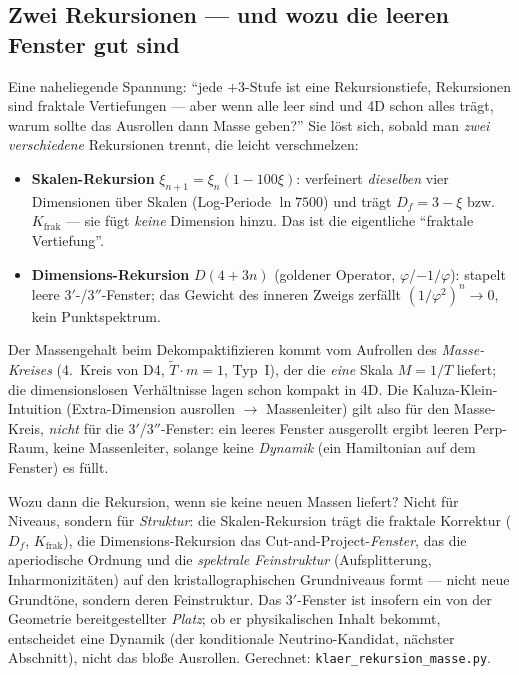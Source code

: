 \subsection{Zwei Rekursionen --- und wozu die leeren Fenster gut sind}
Eine naheliegende Spannung: \enquote{jede $+3$-Stufe ist eine Rekursionstiefe, Rekursionen sind
fraktale Vertiefungen --- aber wenn alle leer sind und 4D schon alles tr\"agt, warum sollte das
Ausrollen dann Masse geben?} Sie l\"ost sich, sobald man \emph{zwei verschiedene} Rekursionen
trennt, die leicht verschmelzen:
\begin{itemize}
  \item \textbf{Skalen-Rekursion} $\xi_{n+1}=\xi_n(1-100\xi)$: verfeinert \emph{dieselben} vier
  Dimensionen \"uber Skalen (Log-Periode $\ln 7500$) und tr\"agt $D_f=3-\xi$ bzw.\ $K_{\text{frak}}$
  --- sie f\"ugt \emph{keine} Dimension hinzu. Das ist die eigentliche \enquote{fraktale Vertiefung}.
  \item \textbf{Dimensions-Rekursion} $D(4+3n)$ (goldener Operator, $\varphi$/$-1/\varphi$): stapelt
  leere $3'$-/$3''$-Fenster; das Gewicht des inneren Zweigs zerf\"allt $(1/\varphi^2)^n\to0$, kein
  Punktspektrum.
\end{itemize}
Der Massengehalt beim Dekompaktifizieren kommt vom Aufrollen des \emph{Masse-Kreises} (4.\ Kreis von
D4, $\tilde T\cdot m=1$, Typ~I), der die \emph{eine} Skala $M=1/T$ liefert; die dimensionslosen
Verh\"altnisse lagen schon kompakt in 4D. Die Kaluza-Klein-Intuition (Extra-Dimension ausrollen
$\to$ Massenleiter) gilt also f\"ur den Masse-Kreis, \emph{nicht} f\"ur die $3'$/$3''$-Fenster: ein
leeres Fenster ausgerollt ergibt leeren Perp-Raum, keine Massenleiter, solange keine \emph{Dynamik}
(ein Hamiltonian auf dem Fenster) es f\"ullt.

Wozu dann die Rekursion, wenn sie keine neuen Massen liefert? Nicht f\"ur Niveaus, sondern f\"ur
\emph{Struktur}: die Skalen-Rekursion tr\"agt die fraktale Korrektur ($D_f$, $K_{\text{frak}}$), die
Dimensions-Rekursion das Cut-and-Project-\emph{Fenster}, das die aperiodische Ordnung und die
\emph{spektrale Feinstruktur} (Aufsplitterung, Inharmonizit\"aten) auf den kristallographischen
Grundniveaus formt --- nicht neue Grundt\"one, sondern deren Feinstruktur. Das $3'$-Fenster ist
insofern ein von der Geometrie bereitgestellter \emph{Platz}; ob er physikalischen Inhalt bekommt,
entscheidet eine Dynamik (der konditionale Neutrino-Kandidat, n\"achster Abschnitt), nicht das
blo\ss e Ausrollen. Gerechnet: \texttt{klaer\_rekursion\_masse.py}.

